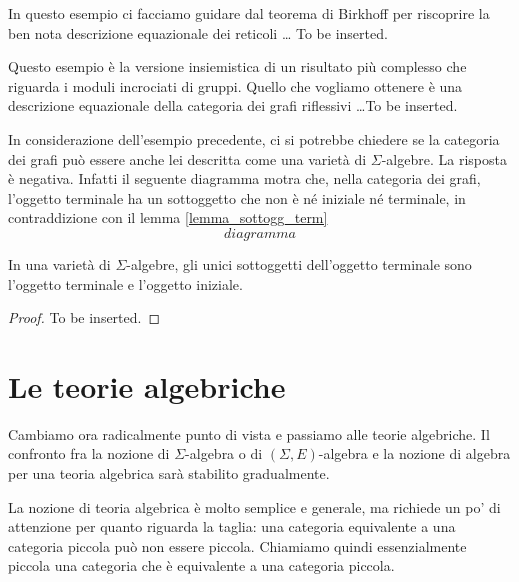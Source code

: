 \begin{example}\label{esempio_Birkhoff_reticoli}
In questo esempio ci facciamo guidare dal teorema di Birkhoff per riscoprire la ben nota descrizione equazionale dei reticoli \ldots
To be inserted.
\end{example} 

\begin{example}\label{esempio_grafi_riflessivi}
Questo esempio è la versione insiemistica di un risultato più complesso che riguarda i moduli incrociati di gruppi. Quello che 
vogliamo ottenere è una descrizione equazionale della categoria dei grafi riflessivi \ldots To be inserted.
\end{example}

\begin{example}\label{esempio_grafi_noneq}
In considerazione dell'esempio precedente, ci si potrebbe chiedere se la categoria dei grafi può essere anche lei descritta come una
varietà di $\Sigma$-algebre. La risposta è negativa. Infatti il seguente diagramma motra che, nella categoria dei grafi, l'oggetto terminale
ha un sottoggetto che non è né iniziale né terminale, in contraddizione con il lemma \ref{lemma_sottogg_term}
\[
  diagramma 
\]
\end{example}

\begin{lemma}\label{lemma_sottogg_term}
In una varietà di $\Sigma$-algebre, gli unici sottoggetti dell'oggetto terminale sono l'oggetto terminale e l'oggetto iniziale.
\end{lemma}

\begin{proof}
To be inserted.
\end{proof}

\section{Le teorie algebriche}\label{sec_teorie_alg}

Cambiamo ora radicalmente punto di vista e passiamo alle teorie algebriche. Il confronto fra la nozione di $\Sigma$-algebra
o di $(\Sigma,E)$-algebra e la nozione di algebra per una teoria algebrica sarà stabilito gradualmente.

La nozione di teoria algebrica è molto semplice e generale, ma richiede un po' di attenzione per quanto riguarda la taglia: una
categoria equivalente a una categoria piccola può non essere piccola. Chiamiamo quindi essenzialmente piccola una categoria 
che è equivalente a una categoria piccola.


